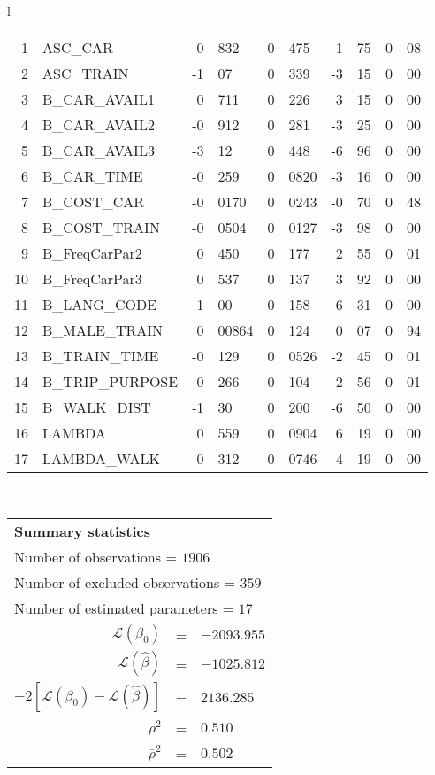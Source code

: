 \begin{tabular}{l}
\begin{tabular}{rlr@{.}lr@{.}lr@{.}lr@{.}l}
1 & ASC_CAR & 0&832 & 0&475 & 1&75 & 0&08\\
2 & ASC_TRAIN & -1&07 & 0&339 & -3&15 & 0&00\\
3 & B_CAR_AVAIL1 & 0&711 & 0&226 & 3&15 & 0&00\\
4 & B_CAR_AVAIL2 & -0&912 & 0&281 & -3&25 & 0&00\\
5 & B_CAR_AVAIL3 & -3&12 & 0&448 & -6&96 & 0&00\\
6 & B_CAR_TIME & -0&259 & 0&0820 & -3&16 & 0&00\\
7 & B_COST_CAR & -0&0170 & 0&0243 & -0&70 & 0&48\\
8 & B_COST_TRAIN & -0&0504 & 0&0127 & -3&98 & 0&00\\
9 & B_FreqCarPar2 & 0&450 & 0&177 & 2&55 & 0&01\\
10 & B_FreqCarPar3 & 0&537 & 0&137 & 3&92 & 0&00\\
11 & B_LANG_CODE & 1&00 & 0&158 & 6&31 & 0&00\\
12 & B_MALE_TRAIN & 0&00864 & 0&124 & 0&07 & 0&94\\
13 & B_TRAIN_TIME & -0&129 & 0&0526 & -2&45 & 0&01\\
14 & B_TRIP_PURPOSE & -0&266 & 0&104 & -2&56 & 0&01\\
15 & B_WALK_DIST & -1&30 & 0&200 & -6&50 & 0&00\\
16 & LAMBDA & 0&559 & 0&0904 & 6&19 & 0&00\\
17 & LAMBDA_WALK & 0&312 & 0&0746 & 4&19 & 0&00\\
\hline
\end{tabular}
\\
\begin{tabular}{rcl}
\multicolumn{3}{l}{\bf Summary statistics}\\
\multicolumn{3}{l}{ Number of observations = $1906$} \\
\multicolumn{3}{l}{ Number of excluded observations = $359$} \\
\multicolumn{3}{l}{ Number of estimated  parameters = $17$} \\
 $\mathcal{L}(\beta_0)$ &=&  $-2093.955$ \\
 $\mathcal{L}(\hat{\beta})$ &=& $-1025.812 $  \\
 $-2[\mathcal{L}(\beta_0) -\mathcal{L}(\hat{\beta})]$ &=& $2136.285$ \\
    $\rho^2$ &=&   $0.510$ \\
    $\bar{\rho}^2$ &=&    $0.502$ \\
\end{tabular}
  \end{tabular}
